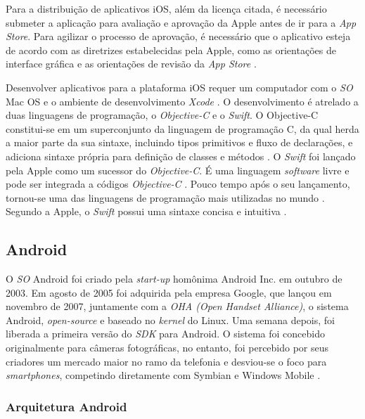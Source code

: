 Para a distribuição de aplicativos iOS, além da licença citada, é necessário submeter a aplicação para avaliação e aprovação da Apple antes de ir para a \textit{App Store}. 
Para agilizar o processo de aprovação, é necessário que o aplicativo esteja de acordo com as diretrizes estabelecidas pela Apple, como as orientações de interface gráfica e as orientações de revisão da \textit{App Store} \cite{apple_inc_submitting_2016}.

Desenvolver aplicativos para a plataforma iOS requer um computador com o \textit{SO} Mac OS e o ambiente de desenvolvimento \textit{Xcode} \cite{heitkotter_evaluating_2013}. 
O desenvolvimento é atrelado a duas linguagens de programação, o \textit{Objective-C} e o \textit{Swift}.
O Objective-C constitui-se em um superconjunto da linguagem de programação C, da qual herda a maior parte da sua sintaxe, incluindo tipos primitivos e fluxo de declarações, e adiciona sintaxe própria para definição de classes e métodos \cite{apple_inc_about_2014}. 
O \textit{Swift} foi lançado pela Apple como um sucessor do \textit{Objective-C}. É uma linguagem \textit{software} livre e pode ser integrada a códigos \textit{Objective-C} \cite{apple_inc_swift_2016}. Pouco tempo após o seu lançamento, tornou-se uma das linguagens de programação mais utilizadas no mundo \cite{rebouas_empirical_2016}. Segundo a Apple, o \textit{Swift} possui uma sintaxe concisa e intuitiva \cite{apple_inc_swift_2016}.

\subsection{Android} \label{subsection:android}

O \textit{SO} Android foi criado pela \textit{start-up} homônima Android Inc. em outubro de 2003. Em agosto de 2005 foi adquirida pela empresa Google, que lançou
em novembro de 2007, juntamente com a \textit{OHA (Open Handset Alliance)}, o sistema Android, \textit{open-source} e baseado no \textit{kernel} do Linux. Uma semana depois, foi liberada a primeira versão do \textit{SDK} para Android.
O sistema foi concebido originalmente para câmeras fotográficas, no entanto, foi percebido por seus criadores um mercado maior no ramo da telefonia e desviou-se o 
foco para \textit{smartphones}, competindo diretamente com Symbian e Windows Mobile \cite{papajorgji_automated_2015}.

\subsubsection{Arquitetura Android} \label{subsection:arc-android}

